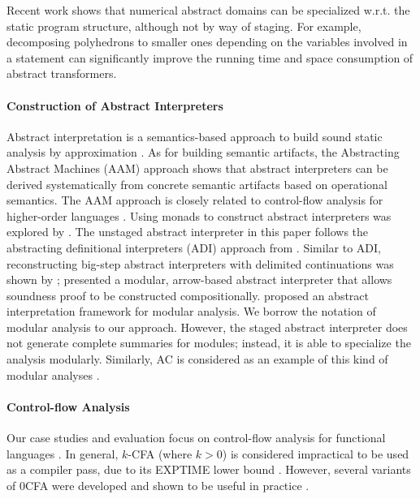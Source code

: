 Recent work shows that numerical abstract domains can be
specialized w.r.t. the static program structure, although not by
way of staging. For example, decomposing polyhedrons
\cite{DBLP:conf/popl/SinghPV17, Singh:2017:PCD:3177123.3158143} to
smaller ones depending on the variables involved in a statement can
significantly improve the running time and space consumption of abstract
transformers.

\paragraph{Construction of Abstract Interpreters} Abstract interpretation is a
semantics-based approach to build sound static analysis by approximation
\cite{DBLP:conf/popl/CousotC77, Cousot98-5}. 
As for building semantic artifacts, the Abstracting Abstract Machines (AAM)
\cite{DBLP:journals/jfp/HornM12, DBLP:conf/icfp/HornM10} approach shows that
abstract interpreters can be derived systematically from concrete semantic
artifacts based on operational semantics. 
The AAM approach is closely related to control-flow analysis for higher-order languages
\cite{Midtgaard:2012:CAF:2187671.2187672, Shivers:1991:SSC:115865.115884}. 
Using monads to construct abstract interpreters was explored by
\citet{Sergey:2013:MAI:2491956.2491979, DBLP:journals/pacmpl/DaraisLNH17,
Darais:2015:GTM:2814270.2814308}.
The unstaged abstract interpreter in this paper follows the abstracting
definitional interpreters (ADI) approach from
\citet{DBLP:journals/pacmpl/DaraisLNH17}.  Similar to ADI, reconstructing
big-step abstract interpreters with delimited continuations was shown by
\citet{Wei:2018:RAA:3243631.3236800}; \citet{Keidel:2018:CSP:3243631.3236767}
presented a modular, arrow-based abstract interpreter that allows soundness
proof to be constructed compositionally. 
\citet{DBLP:conf/cc/CousotC02} proposed an abstract interpretation framework for
modular analysis. We borrow the notation of modular analysis to our approach.
However, the staged abstract interpreter does not generate complete summaries for
modules; instead, it is able to specialize the analysis modularly. Similarly, AC
is considered as an example of this kind of modular analyses \cite{DBLP:conf/cc/CousotC02}.

\paragraph{Control-flow Analysis} Our case studies and evaluation focus on
control-flow analysis for functional languages
\cite{Shivers:1991:SSC:115865.115884, Midtgaard:2012:CAF:2187671.2187672}. In
general, $k$-CFA (where $k > 0$) is considered impractical to be used as a
compiler pass, due to its EXPTIME lower bound
\cite{VanHorn:2008:DKC:1411204.1411243}.  However, several variants of 0CFA
were developed and shown to be useful in practice
\cite{Adams:2011:FTR:2048066.2048105, Bergstrom:2014:PEH:2628136.2628153,
ashley:practical, Reppy:2006:TCA:1159876.1159888}.

